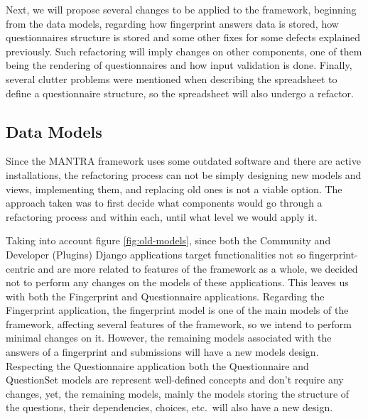 Next, we will propose several changes to be applied to the framework, beginning from the data models, regarding how fingerprint answers data is stored, how questionnaires structure is stored and some other fixes for some defects explained previously.
Such refactoring will imply changes on other components, one of them being the rendering of questionnaires and how input validation is done.
Finally, several clutter problems were mentioned when describing the spreadsheet to define a questionnaire structure, so the spreadsheet will also undergo a refactor.

\subsection{Data Models}


Since the MANTRA framework uses some outdated software and there are active installations, the refactoring process can not be simply designing new models and views, implementing them, and replacing old ones is not a viable option.
The approach taken was to first decide what components would go through a refactoring process and within each, until what level we would apply it.

Taking into account figure \ref{fig:old-models}, since both the Community and Developer (Plugins) Django applications target functionalities not so fingerprint-centric and are more related to features of the framework as a whole, we decided not to perform any changes on the models of these applications.
This leaves us with both the Fingerprint and Questionnaire applications.
Regarding the Fingerprint application, the fingerprint model is one of the main models of the framework, affecting several features of the framework, so we intend to perform minimal changes on it.
However, the remaining models associated with the answers of a fingerprint and submissions will have a new models design.
Respecting the Questionnaire application both the Questionnaire and QuestionSet models are represent well-defined concepts and don't require any changes, yet, the remaining models, mainly the models storing the structure of the questions, their dependencies, choices, etc.\, will also have a new design.

